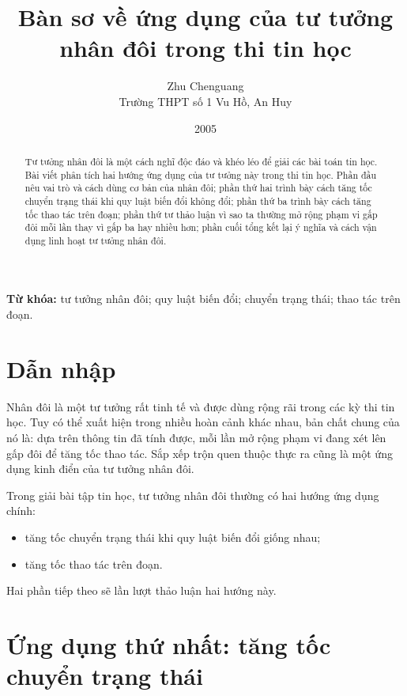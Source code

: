 \documentclass[11pt]{article}
\title{Bàn sơ về ứng dụng của tư tưởng nhân đôi trong thi tin học}
\author{Zhu Chenguang\\Trường THPT số 1 Vu Hồ, An Huy}
\date{2005}
\begin{document}
\maketitle


\renewcommand{\abstractname}{Tóm tắt}
\begin{abstract}
Tư tưởng nhân đôi là một cách nghĩ độc đáo và khéo léo để giải các bài toán
tin học. Bài viết phân tích hai hướng ứng dụng của tư tưởng này trong thi tin
học. Phần đầu nêu vai trò và cách dùng cơ bản của nhân đôi; phần thứ hai trình
bày cách tăng tốc chuyển trạng thái khi quy luật biến đổi không đổi; phần thứ
ba trình bày cách tăng tốc thao tác trên đoạn; phần thứ tư thảo luận vì sao
ta thường mở rộng phạm vi gấp đôi mỗi lần thay vì gấp ba hay nhiều hơn; phần
cuối tổng kết lại ý nghĩa và cách vận dụng linh hoạt tư tưởng nhân đôi.
\end{abstract}

\noindent\textbf{Từ khóa:} tư tưởng nhân đôi; quy luật biến đổi; chuyển trạng
thái; thao tác trên đoạn.

\section{Dẫn nhập}

Nhân đôi là một tư tưởng rất tinh tế và được dùng rộng rãi trong các kỳ thi
tin học. Tuy có thể xuất hiện trong nhiều hoàn cảnh khác nhau, bản chất chung
của nó là: dựa trên thông tin đã tính được, mỗi lần mở rộng phạm vi đang xét
lên gấp đôi để tăng tốc thao tác. Sắp xếp trộn quen thuộc thực ra cũng là một
ứng dụng kinh điển của tư tưởng nhân đôi.

Trong giải bài tập tin học, tư tưởng nhân đôi thường có hai hướng ứng dụng
chính:
\begin{itemize}
  \item tăng tốc chuyển trạng thái khi quy luật biến đổi giống nhau;
  \item tăng tốc thao tác trên đoạn.
\end{itemize}
Hai phần tiếp theo sẽ lần lượt thảo luận hai hướng này.

\section{Ứng dụng thứ nhất: tăng tốc chuyển trạng thái}
\end{document}
